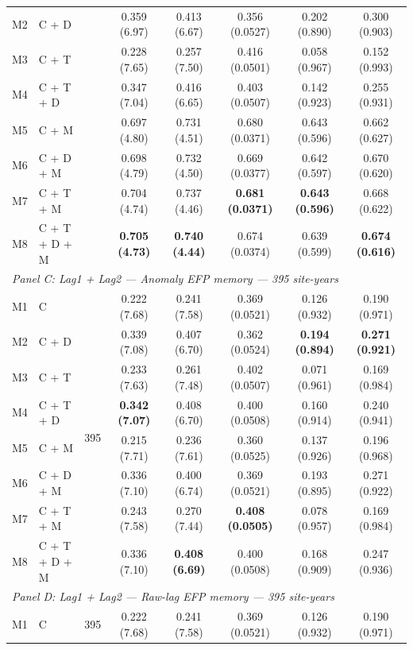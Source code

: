 \begin{table}[htbp]
\begin{tabular}{llcccccc}
M2 & C + D &  & 0.359 (6.97) & 0.413 (6.67) & 0.356 (0.0527) & 0.202 (0.890) & 0.300 (0.903) \\
M3 & C + T &  & 0.228 (7.65) & 0.257 (7.50) & 0.416 (0.0501) & 0.058 (0.967) & 0.152 (0.993) \\
M4 & C + T + D &  & 0.347 (7.04) & 0.416 (6.65) & 0.403 (0.0507) & 0.142 (0.923) & 0.255 (0.931) \\
M5 & C + M &  & 0.697 (4.80) & 0.731 (4.51) & 0.680 (0.0371) & 0.643 (0.596) & 0.662 (0.627) \\
M6 & C + D + M &  & 0.698 (4.79) & 0.732 (4.50) & 0.669 (0.0377) & 0.642 (0.597) & 0.670 (0.620) \\
M7 & C + T + M &  & 0.704 (4.74) & 0.737 (4.46) & \textbf{0.681 (0.0371)} & \textbf{0.643 (0.596)} & 0.668 (0.622) \\
M8 & C + T + D + M &  & \textbf{0.705 (4.73)} & \textbf{0.740 (4.44)} & 0.674 (0.0374) & 0.639 (0.599) & \textbf{0.674 (0.616)} \\
\midrule
\multicolumn{8}{l}{\textit{Panel C: Lag1 + Lag2 --- Anomaly EFP memory --- 395 site-years}} \\
\midrule
M1 & C & \multirow{8}{*}{395} & 0.222 (7.68) & 0.241 (7.58) & 0.369 (0.0521) & 0.126 (0.932) & 0.190 (0.971) \\
M2 & C + D &  & 0.339 (7.08) & 0.407 (6.70) & 0.362 (0.0524) & \textbf{0.194 (0.894)} & \textbf{0.271 (0.921)} \\
M3 & C + T &  & 0.233 (7.63) & 0.261 (7.48) & 0.402 (0.0507) & 0.071 (0.961) & 0.169 (0.984) \\
M4 & C + T + D &  & \textbf{0.342 (7.07)} & 0.408 (6.70) & 0.400 (0.0508) & 0.160 (0.914) & 0.240 (0.941) \\
M5 & C + M &  & 0.215 (7.71) & 0.236 (7.61) & 0.360 (0.0525) & 0.137 (0.926) & 0.196 (0.968) \\
M6 & C + D + M &  & 0.336 (7.10) & 0.400 (6.74) & 0.369 (0.0521) & 0.193 (0.895) & 0.271 (0.922) \\
M7 & C + T + M &  & 0.243 (7.58) & 0.270 (7.44) & \textbf{0.408 (0.0505)} & 0.078 (0.957) & 0.169 (0.984) \\
M8 & C + T + D + M &  & 0.336 (7.10) & \textbf{0.408 (6.69)} & 0.400 (0.0508) & 0.168 (0.909) & 0.247 (0.936) \\
\midrule
\multicolumn{8}{l}{\textit{Panel D: Lag1 + Lag2 --- Raw-lag EFP memory --- 395 site-years}} \\
\midrule
M1 & C & \multirow{8}{*}{395} & 0.222 (7.68) & 0.241 (7.58) & 0.369 (0.0521) & 0.126 (0.932) & 0.190 (0.971) \\

\end{tabular}
\end{table}
